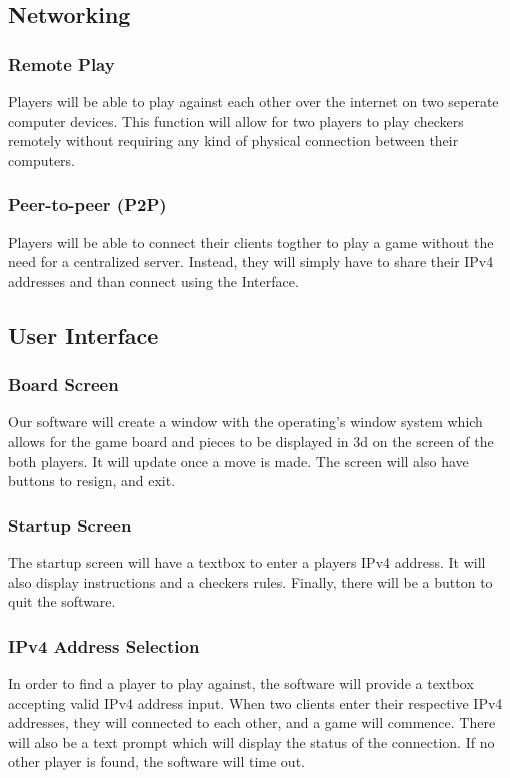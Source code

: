 \subsection{Networking}
\subsubsection{Remote Play}
Players will be able to play against each other over the internet on two
seperate computer devices. This function will allow for two players to play
checkers remotely without requiring any kind of physical connection between
their computers.

\subsubsection{Peer-to-peer (P2P)}
Players will be able to connect their clients togther to play a game without
the need for a centralized server. Instead, they will simply have to share
their IPv4 addresses and than connect using the Interface.

\subsection{User Interface}
\subsubsection{Board Screen}
Our software will create a window with the operating's window system which
allows for the game board and pieces to be displayed in 3d on the screen of the
both players. It will update once a move is made. The screen will also have
buttons to resign, and exit.

\subsubsection{Startup Screen}
The startup screen will have a textbox to enter a players IPv4 address. It
will also display instructions and a checkers rules. Finally, there will be a
button to quit the software.

\subsubsection{IPv4 Address Selection}
In order to find a player to play against, the software will provide a textbox
accepting valid IPv4 address input. When two clients enter their respective IPv4
addresses, they will connected to each other, and a game will commence. There
will also be a text prompt which will display the status of the connection.
If no other player is found, the software will time out.

